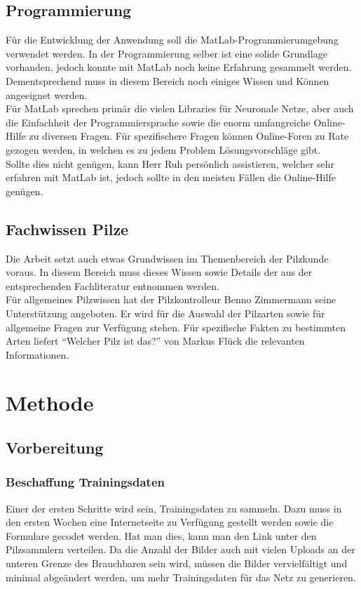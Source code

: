 \subsection{Programmierung}
Für die Entwicklung der Anwendung soll die MatLab-Programmierumgebung verwendet werden. In der Programmierung selber ist eine solide Grundlage vorhanden, jedoch konnte mit MatLab noch keine Erfahrung gesammelt werden. Dementsprechend muss in diesem Bereich noch einiges Wissen und Können angeeignet werden.\\
Für MatLab sprechen primär die vielen Libraries für Neuronale Netze, aber auch die Einfachheit der Programmiersprache sowie die enorm umfangreiche Online-Hilfe zu diversen Fragen. Für spezifischere Fragen können Online-Foren zu Rate gezogen werden, in welchen es zu jedem Problem Lösungsvorschläge gibt.\\
Sollte dies nicht genügen, kann Herr Ruh persönlich assistieren, welcher sehr erfahren mit MatLab ist, jedoch sollte in den meisten Fällen die Online-Hilfe genügen.
	
\subsection{Fachwissen Pilze}
Die Arbeit setzt auch etwas Grundwissen im Themenbereich der Pilzkunde voraus. In diesem Bereich muss dieses Wissen sowie Details der aus der entsprechenden Fachliteratur entnommen werden.\\
Für allgemeines Pilzwissen hat der Pilzkontrolleur Benno Zimmermann seine Unterstützung angeboten. Er wird für die Auswahl der Pilzarten sowie für allgemeine Fragen zur Verfügung stehen. Für spezifische Fakten zu bestimmten Arten liefert ``Welcher Pilz ist das?'' von Markus Flück die relevanten Informationen.

	
\section{Methode}
\subsection{Vorbereitung}
\subsubsection{Beschaffung Trainingsdaten}
Einer der ersten Schritte wird sein, Trainingsdaten zu sammeln. Dazu muss in den ersten Wochen eine Internetseite zu Verfügung gestellt werden sowie die Formulare gecodet werden. Hat man dies, kann man den Link unter den Pilzsammlern verteilen. Da die Anzahl der Bilder auch mit vielen Uploads an der unteren Grenze des Brauchbaren sein wird, müssen die Bilder vervielfältigt und minimal abgeändert werden, um mehr Trainingsdaten für das Netz zu generieren.
